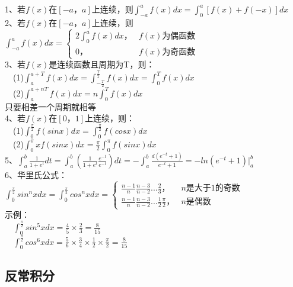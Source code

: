 \documentclass{article}
\begin{document}
\begin{flushleft}
	1、若$f(x)$在$[-a，a]$上连续，则$\int_{-a}^{a}f(x)dx=\int_{0}^{a}[f(x)+f(-x)]dx$\\
	2、若$f(x)$在$[-a，a]$上连续，则$\int_{-a}^{a}f(x)dx=\left\{
	\begin{array}{lcl}
	2\int_{0}^{a}f(x)dx， & f(x)\mbox{为偶函数}\\
	0， & f(x)\mbox{为奇函数}
	\end{array} \right.$\\
	3、若$f(x)$是连续函数且周期为T，则：\\
	\ \ (1)$\int_{a}^{a+T}f(x)dx=\int_{-\frac{T}{2}}^{\frac{T}{2}}f(x)dx=\int_{0}^{T}f(x)dx$\\
	\ \ (2)$\int_{a}^{a+nT}f(x)dx=n\int_{0}^{T}f(x)dx$\\
	只要相差一个周期就相等\\
	4、若$f(x)$在$[0，1]$上连续，则：\\
	\ \ (1)$\int_{0}^{\frac{\pi}{2}}f(sinx)dx=\int_{0}^{\frac{\pi}{2}}f(cosx)dx$\\
	\ \ (2)$\int_{0}^{\pi}xf(sinx)dx=\frac{\pi}{2}\int_{0}^{\pi}f(sinx)dx$\\
	5、$\int_{a}^{b}\frac{1}{1+e^t}dt=\int_{a}^{b}(\frac{1}{1+e^t}\frac{e^{-t}}{e^{-t}})dt=-\int_{a}^{b}\frac{d(e^{-t}+1)}{e^{-t}+1}=-ln(e^{-t}+1)|_a^b$\\
	6、华里氏公式：$\int_{0}^{\frac{\pi}{2}}sin^nxdx=\int_{0}^{\frac{\pi}{2}}cos^nxdx=\left\{
	\begin{array}{lcl}
	\frac{n-1}{n}\frac{n-3}{n-2}...\frac{2}{3}， & n\mbox{是大于1的奇数}\\
	\frac{n-1}{n}\frac{n-3}{n-2}...\frac{1}{2}\frac{\pi}{2}， & n\mbox{是偶数}
	\end{array} \right.$\\
	示例：\\
	\ \ $\int_{0}^{\frac{\pi}{2}}sin^5xdx=\frac{4}{5}\times\frac{2}{3}=\frac{8}{15}$\\
	\ \ $\int_{0}^{\frac{\pi}{2}}cos^6xdx=\frac{5}{6}\times\frac{3}{4}\times\frac{1}{2}\times\frac{\pi}{2}=\frac{8}{15}$\\
	
	\subsection{反常积分}
	

\end{flushleft}
\end{document}
